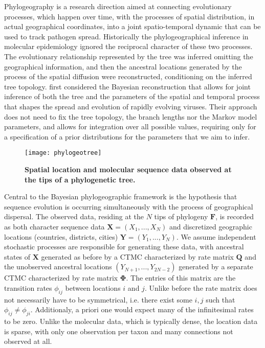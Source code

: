 Phylogeography is a research direction aimed at connecting evolutionary processes, which happen over time, with the processes of spatial distribution, in actual geographical coordinates, into a joint spatio-temporal dynamic that can be used to track pathogen spread.
Historically the phylogeographical inference in molecular epidemiology ignored the reciprocal character of these two processes. 
The evolutionary relationship represented by the tree was inferred omitting the geographical information, and then the ancestral locations generated by the process of the spatial diffusion were reconstructed, conditioning on the inferred tree topology.
\citet{Lemey2009} first considered the Bayesian reconstruction that allows for joint inference of both the tree and the parameters of the spatial and temporal process that shapes the spread and evolution of 
rapidly evolving viruses.
Their approach does not need to fix the tree topology, the branch lengths nor the Markov model parameters, and allows for integration over all possible values, requiring only for a specification of a prior distributions for the parameters that we aim to infer.

\begin{figure}[H]
\centering
\texttt{[image: phylogeotree]} 
\caption{
{ \footnotesize 
{\bf Spatial location and molecular sequence data observed at the tips of a phylogenetic tree.} 
}%
}
\label{fig:phylogeotree}
\end{figure}

Central to the Bayesian phylogeographic framework is the hypothesis that sequence evolution is occurring simultaneously with the process of geographical dispersal. 
The observed data, residing at the $N$ tips of phylogeny $\mathbf{F}$, is recorded as both character sequence data $\mathbf{X}=(X_{1},...,X_{N})$ and discretized geographic locations (countries, districts, cities) $\mathbf{Y}=(Y_{1},...,Y_{N})$.
We assume independent stochastic processes are responsible for generating these data, with ancestral states of $\mathbf{X}$ generated as before by a CTMC characterized by rate matrix $\mathbf{Q}$ and the unobserved ancestral locations $(Y_{N+1},...,Y_{2N-2})$ generated by a separate CTMC characterized by rate matrix $\mathbf{\Phi}$.
The entries of this matrix are the transition rates $\phi_{ij}$ between locations $i$ and $j$.
Unlike before the rate matrix does not necessarily have to be symmetrical, i.e. there exist some $i,j$ such that $\phi_{ij}\neq\phi_{ji}$.
Additionaly, a priori one would expect many of the infinitesimal rates to be zero. 
Unlike the molecular data, which is typically dense, the location data is sparse, with only one observation per taxon and many connections not observed at all.

